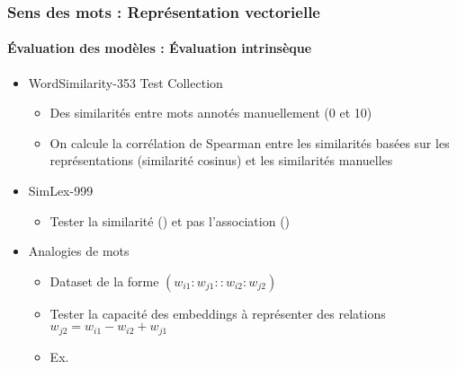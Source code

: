 \documentclass[xcolor=table]{beamer}
\begin{document}
\begin{frame}
\frametitle{Sens des mots : Représentation vectorielle}
\framesubtitle{Évaluation des modèles : Évaluation intrinsèque}

\begin{itemize}
	\item  WordSimilarity-353 Test Collection \cite{2002-finkelstein-al}
	\begin{itemize}
		\item Des similarités entre mots annotés manuellement (0 et 10)
		\item On calcule la corrélation de Spearman entre les similarités basées sur les représentations (similarité cosinus) et les similarités manuelles
	\end{itemize}
	
	\item SimLex-999 \cite{2015-hill-al}
	\begin{itemize}
		\item Tester la similarité () et pas l'association ()
	\end{itemize}

	\item Analogies de mots \cite{2013-mikolov-al2}
	\begin{itemize}
		\item Dataset de la forme $(w_{i1}:w_{j1} :: w_{i2}:w_{j2})$
		\item Tester la capacité des embeddings à représenter des relations $w_{j2} = w_{i1} - w_{i2} + w_{j1}$
		\item Ex. 
	\end{itemize}

\end{itemize}
	
\end{frame}
\end{document}
